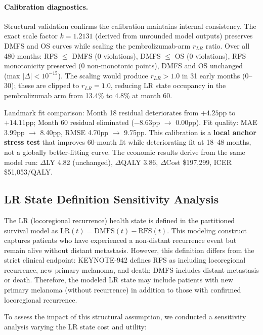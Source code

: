 \documentclass[11pt,a4paper]{article}
\begin{document}
\paragraph{Calibration diagnostics.} Structural validation confirms the calibration maintains internal consistency. The exact scale factor $k=1.2131$ (derived from unrounded model outputs) preserves DMFS and OS curves while scaling the pembrolizumab-arm $r_{LR}$ ratio. Over all 480 months: RFS $\leq$ DMFS (0 violations), DMFS $\leq$ OS (0 violations), RFS monotonicity preserved (0 non-monotonic points), DMFS and OS unchanged (max $|\Delta| < 10^{-15}$). The scaling would produce $r_{LR}>1.0$ in 31 early months (0--30); these are clipped to $r_{LR}=1.0$, reducing LR state occupancy in the pembrolizumab arm from 13.4\% to 4.8\% at month 60.

Landmark fit comparison: Month 18 residual deteriorates from $+4.25$pp to $+14.11$pp; Month 60 residual eliminated ($-8.63$pp $\to$ 0.00pp). Fit quality: MAE 3.99pp $\to$ 8.40pp, RMSE 4.70pp $\to$ 9.75pp. This calibration is a \textbf{local anchor stress test} that improves 60-month fit while deteriorating fit at 18--48 months, not a globally better-fitting curve. The economic results derive from the same model run: $\Delta$LY 4.82 (unchanged), $\Delta$QALY 3.86, $\Delta$Cost \$197,299, ICER \$51,053/QALY.

\subsection{LR State Definition Sensitivity Analysis}
\label{sec:lr_sensitivity}

The LR (locoregional recurrence) health state is defined in the partitioned survival model as $\text{LR}(t) = \text{DMFS}(t) - \text{RFS}(t)$. This modeling construct captures patients who have experienced a non-distant recurrence event but remain alive without distant metastasis. However, this definition differs from the strict clinical endpoint: KEYNOTE-942 defines RFS as including locoregional recurrence, new primary melanoma, and death; DMFS includes distant metastasis or death. Therefore, the modeled LR state may include patients with new primary melanoma (without recurrence) in addition to those with confirmed locoregional recurrence.

To assess the impact of this structural assumption, we conducted a sensitivity analysis varying the LR state cost and utility:
\end{document}
